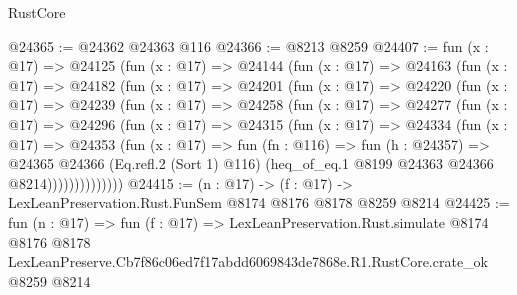 \begin{lexlean}{RustCore}
\begin{coremodule}
@24365 := @24362 @24363 @116
@24366 := @8213 @8259
@24407 := fun (x : @17) =>
  @24125
    (fun (x : @17) =>
    @24144
      (fun (x : @17) =>
      @24163
        (fun (x : @17) =>
        @24182
          (fun (x : @17) =>
          @24201
            (fun (x : @17) =>
            @24220
              (fun (x : @17) =>
              @24239
                (fun (x : @17) =>
                @24258
                  (fun (x : @17) =>
                  @24277
                    (fun (x : @17) =>
                    @24296
                      (fun (x : @17) =>
                      @24315
                        (fun (x : @17) =>
                        @24334
                          (fun (x : @17) =>
                          @24353
                            (fun (x : @17) =>
                            fun (fn : @116) =>
                            fun (h : @24357) =>
                            @24365
                              @24366
                              (Eq.refl.{2} (Sort 1) @116)
                              (heq_of_eq.{1} @8199 @24363 @24366 @8214))))))))))))))
@24415 := (n : @17) -> (f : @17) -> LexLeanPreservation.Rust.FunSem @8174 @8176 @8178 @8259 @8214
@24425 := fun (n : @17) =>
  fun (f : @17) =>
  LexLeanPreservation.Rust.simulate
    @8174
    @8176
    @8178
    LexLeanPreserve.Cb7f86c06ed7f17abdd6069843de7868e.R1.RustCore.crate_ok
    @8259
    @8214
\end{coremodule}
\end{lexlean}
